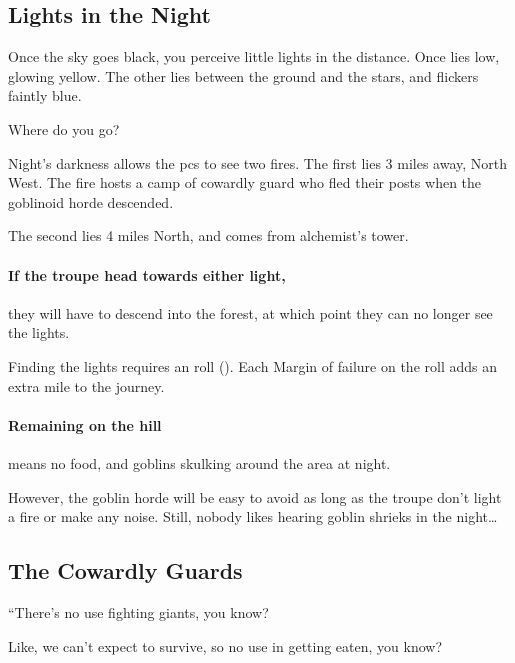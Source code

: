 \begin{multicols}{2}

\subsection{Lights in the Night}

\begin{boxtext}
  Once the sky goes black, you perceive little lights in the distance.
  Once lies low, glowing yellow.
  The other lies between the ground and the stars, and flickers faintly blue.

  Where do you go?
\end{boxtext}

Night's darkness allows the \glspl{pc} to see two fires.
The first lies 3 miles away, North West.
The fire hosts a camp of cowardly \gls{guard} who fled their posts when the goblinoid horde descended.

The second lies 4 miles North, and comes from \gls{alchemist}'s tower.

\paragraph{If the troupe head towards either light,}
they will have to descend into the forest, at which point they can no longer see the lights.

Finding the lights requires an  roll (\tn[9]).
Each Margin of failure on the roll adds an extra mile to the journey.%

\paragraph{Remaining on the hill}
means no food, and goblins skulking around the area at night.

However, the goblin horde will be easy to avoid as long as the troupe don't light a fire or make any noise.
Still, nobody likes hearing goblin shrieks in the night\ldots

\subsection{The Cowardly Guards}

\begin{speechtext}
  ``There's no use fighting giants, you know?

  Like, we can't expect to survive, so no use in getting eaten, you know?


\end{speechtext}
\end{multicols}
